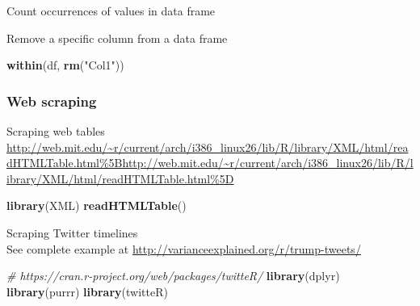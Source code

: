 \documentclass[10,portrait]{article}
\newenvironment{Shaded}{\begin{snugshade}}{\end{snugshade}}
\newcommand{\KeywordTok}[1]{\textcolor[rgb]{0.13,0.29,0.53}{\textbf{#1}}}
\newcommand{\StringTok}[1]{\textcolor[rgb]{0.31,0.60,0.02}{#1}}
\newcommand{\CommentTok}[1]{\textcolor[rgb]{0.56,0.35,0.01}{\textit{#1}}}
\newcommand{\OperatorTok}[1]{\textcolor[rgb]{0.81,0.36,0.00}{\textbf{#1}}}
\newcommand{\NormalTok}[1]{#1}
\begin{document}
Count occurrences of values in data frame

\begin{Shaded}
\end{Shaded}

Remove a specific column from a data frame

\begin{Shaded}
\begin{Highlighting}[]
\KeywordTok{within}\NormalTok{(df, }\KeywordTok{rm}\NormalTok{(}\StringTok{"Col1"}\NormalTok{))}
\end{Highlighting}
\end{Shaded}

\subsubsection{Web scraping}\label{web-scraping}

Scraping web tables\\
\url{http://web.mit.edu/~r/current/arch/i386_linux26/lib/R/library/XML/html/readHTMLTable.html\%5Bhttp://web.mit.edu/~r/current/arch/i386_linux26/lib/R/library/XML/html/readHTMLTable.html\%5D}

\begin{Shaded}
\begin{Highlighting}[]
\KeywordTok{library}\NormalTok{(XML)}
\KeywordTok{readHTMLTable}\NormalTok{()}
\end{Highlighting}
\end{Shaded}

Scraping Twitter timelines\\
See complete example at
\url{http://varianceexplained.org/r/trump-tweets/}

\begin{Shaded}
\begin{Highlighting}[]
\CommentTok{# https://cran.r-project.org/web/packages/twitteR/}
\KeywordTok{library}\NormalTok{(dplyr)}
\KeywordTok{library}\NormalTok{(purrr)}
\KeywordTok{library}\NormalTok{(twitteR)}
\end{Highlighting}
\end{Shaded}

\printbibliography
\end{document}
